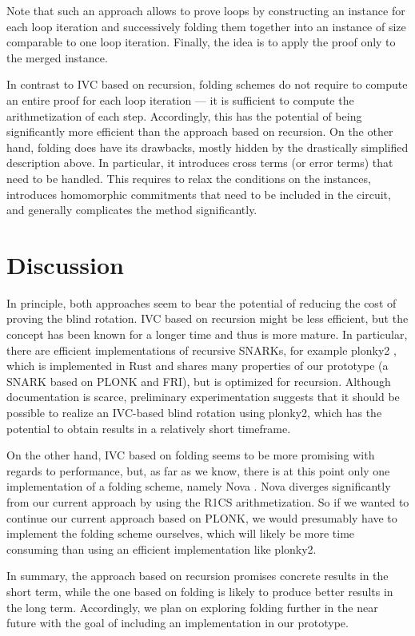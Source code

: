 \documentclass{zamarep}
\begin{document}
Note that such an approach allows to prove loops by constructing an instance for each loop iteration and successively folding them together into an instance of size comparable to one loop iteration. Finally, the idea is to apply the proof only to the merged instance.

In contrast to IVC based on recursion, folding schemes do not require to compute an entire proof for each loop iteration --- it is sufficient to compute the arithmetization of each step. Accordingly, this has the potential of being significantly more efficient than the approach based on recursion. On the other hand, folding does have its drawbacks, mostly hidden by the drastically simplified description above. In particular, it introduces cross terms (or error terms) that need to be handled. This requires to relax the conditions on the instances, introduces homomorphic commitments that need to be included in the circuit, and generally complicates the method significantly.

\section{Discussion}
\label{sec:dis}

In principle, both approaches seem to bear the potential of reducing the cost of proving the blind rotation. IVC based on recursion might be less efficient, but the concept has been known for a longer time and thus is more mature. In particular, there are efficient implementations of recursive SNARKs, for example plonky2 \cite{plonky2}, which is implemented in Rust and shares many properties of our prototype (a SNARK based on PLONK and FRI), but is optimized for recursion. Although documentation is scarce, preliminary experimentation suggests that it should be possible to realize an IVC-based blind rotation using plonky2, which has the potential to obtain results in a relatively short timeframe.

On the other hand, IVC based on folding seems to be more promising with regards to performance, but, as far as we know, there is at this point only one implementation of a folding scheme, namely Nova \cite{nova,C:KotSetTzi22}. Nova diverges significantly from our current approach by using the R1CS arithmetization. So if we wanted to continue our current approach based on PLONK, we would presumably have to implement the folding scheme ourselves, which will likely be more time consuming than using an efficient implementation like plonky2.

In summary, the approach based on recursion promises concrete results in the short term, while the one based on folding is likely to produce better results in the long term. Accordingly, we plan on exploring folding further in the near future with the goal of including an implementation in our prototype. 




\end{document}
